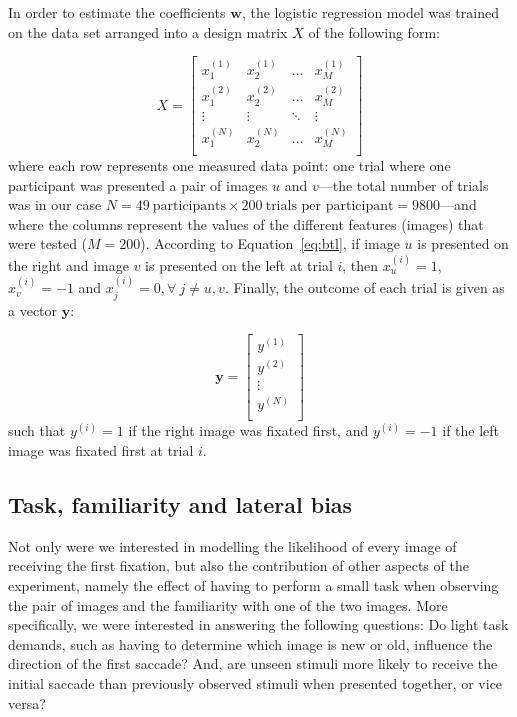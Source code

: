 {In order to estimate the coefficients $\mathbf{w}$, the logistic regression model was trained on the data set arranged into a design matrix $X$ of the following form:

\begin{equation}
\label{eq:matrix_x}
X = 
\begin{bmatrix}
    x_{1}^{(1)} & x_{2}^{(1)} & \dots  & x_{M}^{(1)} \\
    x_{1}^{(2)} & x_{2}^{(2)} & \dots  & x_{M}^{(2)} \\
    \vdots      & \vdots      & \ddots & \vdots      \\
    x_{1}^{(N)} & x_{2}^{(N)} & \dots  & x_{M}^{(N)} \\
\end{bmatrix}
\end{equation}
%
where each row represents one measured data point: one trial where one participant was presented a pair of images $u$ and $v$---the total number of trials was in our case $N = 49~\text{participants} \times 200~\text{trials per participant} = 9800$---and where the columns represent the values of the different features (images) that were tested ($M = 200$). According to Equation~\ref{eq:btl}, if image $u$ is presented on the right and image $v$ is presented on the left at trial $i$, then $x_{u}^{(i)}=1$, $x_{v}^{(i)}=-1$ and $x_{j}^{(i)}=0, \forall~j \neq u,v$. Finally, the outcome of each trial is given as a vector $\mathbf{y}$:

\[
\mathbf{y} =
\begin{bmatrix}
    y^{(1)} \\
    y^{(2)} \\
    \vdots  \\
    y^{(N)} \\
\end{bmatrix}
\]
%
such that $y^{(i)} = 1$ if the right image was fixated first, and $y^{(i)} = -1$ if the left image was fixated first at trial $i$. 

\subsection{Task, familiarity and lateral bias} 
\label{sec:globsal-biases}
Not only were we interested in modelling the likelihood of every image of receiving the first fixation, but also the contribution of other aspects of the experiment, namely the effect of having to perform a small task when observing the pair of images and the familiarity with one of the two images. More specifically, we were interested in answering the following questions: Do light task demands, such as having to determine  which image is new or old, influence the direction of the first saccade? And, are unseen stimuli more likely to receive the initial saccade than previously observed stimuli when presented together, or vice versa?

}
